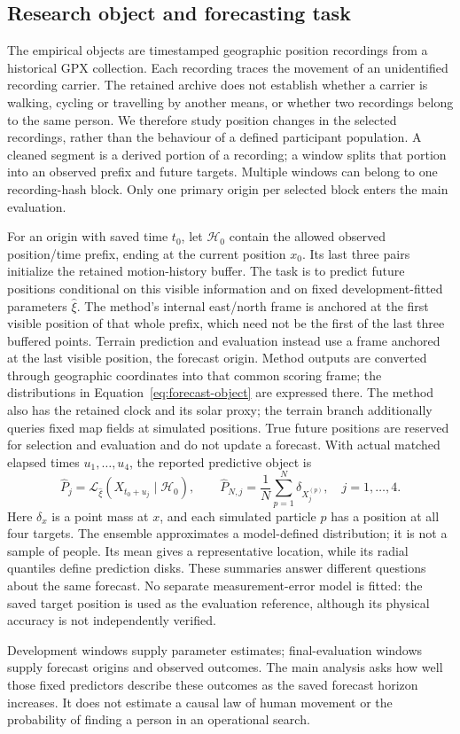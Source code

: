 \subsection{Research object and forecasting task}\label{sec:forecast-task}
The empirical objects are timestamped geographic position recordings from
a historical GPX collection. Each recording traces the movement of an
unidentified recording carrier. The retained archive does not establish
whether a carrier is walking, cycling or travelling by another means, or
whether two recordings belong to the same person. We therefore study
position changes in the selected recordings, rather than the behaviour of
a defined participant population. A cleaned segment is a derived portion
of a recording; a window splits that portion into an observed prefix and
future targets. Multiple windows can belong to one recording-hash block.
Only one primary origin per selected block enters the main evaluation.

For an origin with saved time $t_0$, let $\mathcal H_0$ contain the allowed
observed position/time prefix, ending at the current position $x_0$.
Its last three pairs initialize the retained motion-history buffer.
The task is to predict future positions conditional on this visible
information and on fixed development-fitted parameters $\widehat\xi$.
The method's internal east/north frame is anchored at the first visible
position of that whole prefix, which need not be the first of the last
three buffered points. Terrain prediction and evaluation instead use a frame anchored
at the last visible position, the forecast origin. Method outputs are
converted through geographic coordinates into that common scoring frame;
the distributions in Equation~\eqref{eq:forecast-object} are expressed
there. The method also has the retained clock and
its solar proxy; the terrain branch additionally queries fixed map fields
at simulated positions. True future positions are reserved for selection
and evaluation and do not update a forecast. With actual matched elapsed
times $u_1,\ldots,u_4$, the reported predictive object is
\begin{equation}\label{eq:forecast-object}
 \widehat P_j=\mathcal L_{\widehat\xi}(X_{t_0+u_j}\mid\mathcal H_0),
 \qquad
 \widehat P_{N,j}=\frac1N\sum_{p=1}^{N}\delta_{X_j^{(p)}},
 \quad j=1,\ldots,4 .
\end{equation}
Here $\delta_x$ is a point mass at $x$, and each simulated particle $p$
has a position at all four targets. The ensemble approximates a
model-defined distribution; it is not a sample of people. Its mean gives
a representative location, while its radial quantiles define prediction
disks. These summaries answer different questions about the same forecast.
No separate measurement-error model is fitted: the saved target position
is used as the evaluation reference, although its physical accuracy is
not independently verified.

Development windows supply parameter estimates; final-evaluation windows
supply forecast origins and observed outcomes. The main analysis asks how
well those fixed predictors describe these outcomes as the saved forecast
horizon increases. It does not estimate a causal law of human movement or
the probability of finding a person in an operational search.
